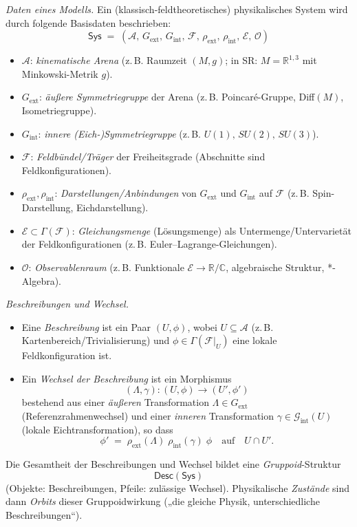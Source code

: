 \documentclass[10pt, letterpaper]{article}
\newcommand{\R}{\mathbb{R}}
\newcommand{\C}{\mathbb{C}}
\begin{document}
\emph{Daten eines Modells.}
Ein (klassisch-feldtheoretisches) physikalisches System wird durch folgende Basisdaten beschrieben:
\[
\mathsf{Sys}
\;=\;
(\mathcal{A},\,G_{\mathrm{ext}},\,G_{\mathrm{int}},\,\mathcal{F},\,\rho_{\mathrm{ext}},\,\rho_{\mathrm{int}},\,\mathcal{E},\,\mathcal{O})
\]
\begin{itemize}
\item $\mathcal{A}$: \emph{kinematische Arena} (z.\,B. Raumzeit $(M,g)$; in SR: $M=\R^{1,3}$ mit Minkowski-Metrik $g$).
\item $G_{\mathrm{ext}}$: \emph{äußere Symmetriegruppe} der Arena (z.\,B. Poincaré-Gruppe, Diff$(M)$, Isometriegruppe).
\item $G_{\mathrm{int}}$: \emph{innere (Eich-)Symmetriegruppe} (z.\,B. $U(1),\, SU(2),\, SU(3)$).
\item $\mathcal{F}$: \emph{Feldbündel/Träger} der Freiheitsgrade (Abschnitte sind Feldkonfigurationen).
\item $\rho_{\mathrm{ext}},\rho_{\mathrm{int}}$: \emph{Darstellungen/Anbindungen} von $G_{\mathrm{ext}}$ und $G_{\mathrm{int}}$ auf $\mathcal{F}$ (z.\,B. Spin-Darstellung, Eichdarstellung).
\item $\mathcal{E}\subset \Gamma(\mathcal{F})$: \emph{Gleichungsmenge} (Lösungsmenge) als Untermenge/Untervarietät der Feldkonfigurationen (z.\,B. Euler–Lagrange-Gleichungen).
\item $\mathcal{O}$: \emph{Observablenraum} (z.\,B. Funktionale $\mathcal{E}\to \R/\C$, algebraische Struktur, *-Algebra).
\end{itemize}

\emph{Beschreibungen und Wechsel.}
\begin{itemize}
\item Eine \emph{Beschreibung} ist ein Paar $(U,\phi)$, wobei $U\subseteq \mathcal{A}$ (z.\,B. Kartenbereich/Trivialisierung) und
$\phi\in \Gamma(\mathcal{F}|_U)$ eine lokale Feldkonfiguration ist.
\item Ein \emph{Wechsel der Beschreibung} ist ein Morphismus
\[
(\Lambda,\gamma): (U,\phi)\longrightarrow (U',\phi')
\]
bestehend aus einer \emph{äußeren} Transformation $\Lambda\in G_{\mathrm{ext}}$ (Referenzrahmenwechsel) und einer \emph{inneren} Transformation $\gamma\in \mathcal{G}_{\mathrm{int}}(U)$
(lokale Eichtransformation), so dass
\[
\phi' \;=\; \rho_{\mathrm{ext}}(\Lambda)\;\rho_{\mathrm{int}}(\gamma)\;\phi
\quad\text{auf}\quad U\cap U'.
\]
\end{itemize}
Die Gesamtheit der Beschreibungen und Wechsel bildet eine \emph{Gruppoid}-Struktur
\[
\mathsf{Desc}(\mathsf{Sys})
\]
(Objekte: Beschreibungen, Pfeile: zulässige Wechsel). Physikalische \emph{Zustände} sind dann \emph{Orbits} dieser Gruppoidwirkung
(„die gleiche Physik, unterschiedliche Beschreibungen“).
\end{document}
